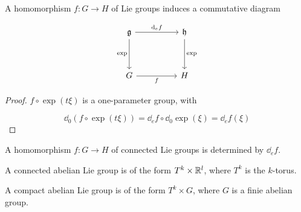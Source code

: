 \begin{lemma}
    [naturality] A homomorphism \(f : G \to H\) of Lie groups induces a commutative diagram

\[\begin{tikzcd}
	\mfg && \mfh \\
	\\
	G && H
	\arrow["{\dd_ef}", from=1-1, to=1-3]
	\arrow["\exp"', from=1-1, to=3-1]
	\arrow["\exp", from=1-3, to=3-3]
	\arrow["f"', from=3-1, to=3-3]
\end{tikzcd}\]
\end{lemma}

\begin{proof}
    \(f \circ \exp(t\xi)\) is a one-parameter group, with

    \[\dd_0\left(f \circ \exp(t\xi)\right) = \dd_ef \circ \dd_0 \exp (\xi) = \dd_ef(\xi)\]
\end{proof}

\begin{corollary}
    A homomorphism \(f : G \to H\) of connected Lie groups is determined by \(\dd_e f\).
\end{corollary}

\begin{theorem}
    A connected abelian Lie group is of the form \(T^k \times \mathbb{R}^l\), where \(T^k\) is the \(k\)-torus.
\end{theorem}

\begin{corollary}
    A compact abelian Lie group is of the form \(T^k \times G\), where \(G\) is a finie abelian group.
\end{corollary}
